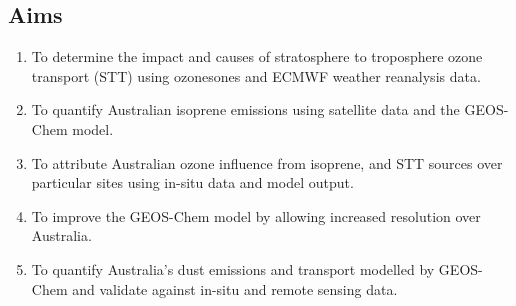 
\subsection{Aims}
\begin{enumerate}
\item To determine the impact and causes of stratosphere to troposphere ozone transport (STT) using ozonesones and ECMWF weather reanalysis data.
\item To quantify Australian isoprene emissions using satellite data and the GEOS-Chem model. 
\item To attribute Australian ozone influence from isoprene, and STT sources over particular sites using in-situ data and model output.
\item To improve the GEOS-Chem model by allowing increased resolution over Australia.
\item To quantify Australia's dust emissions and transport modelled by GEOS-Chem and validate against in-situ and remote sensing data.
\end{enumerate}